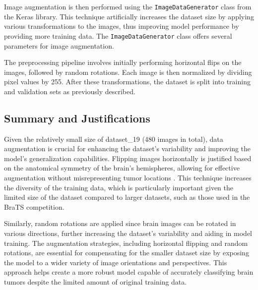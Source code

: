 Image augmentation is then performed using the \texttt{ImageDataGenerator} class from the Keras library. This technique artificially increases the dataset size by applying various transformations to the images, thus improving model performance by providing more training data. The \texttt{ImageDataGenerator} class offers several parameters for image augmentation.

The preprocessing pipeline involves initially performing horizontal flips on the images, followed by random rotations. Each image is then normalized by dividing pixel values by 255. After these transformations, the dataset is split into training and validation sets as previously described.

\subsection{Summary and Justifications}

Given the relatively small size of dataset\_19 (480 images in total), data augmentation is crucial for enhancing the dataset's variability and improving the model's generalization capabilities. Flipping images horizontally is justified based on the anatomical symmetry of the brain's hemispheres, allowing for effective augmentation without misrepresenting tumor locations \cite{nalepa_data_2019}. This technique increases the diversity of the training data, which is particularly important given the limited size of the dataset compared to larger datasets, such as those used in the BraTS competition.

Similarly, random rotations are applied since brain images can be rotated in various directions, further increasing the dataset's variability and aiding in model training. The augmentation strategies, including horizontal flipping and random rotations, are essential for compensating for the smaller dataset size by exposing the model to a wider variety of image orientations and perspectives. This approach helps create a more robust model capable of accurately classifying brain tumors despite the limited amount of original training data.


